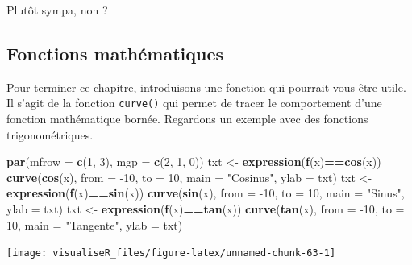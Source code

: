 \documentclass[]{article}
\newenvironment{Shaded}{\begin{snugshade}}{\end{snugshade}}
\newcommand{\DataTypeTok}[1]{\textcolor[rgb]{0.13,0.29,0.53}{#1}}
\newcommand{\DecValTok}[1]{\textcolor[rgb]{0.00,0.00,0.81}{#1}}
\newcommand{\KeywordTok}[1]{\textcolor[rgb]{0.13,0.29,0.53}{\textbf{#1}}}
\newcommand{\NormalTok}[1]{#1}
\newcommand{\OperatorTok}[1]{\textcolor[rgb]{0.81,0.36,0.00}{\textbf{#1}}}
\newcommand{\StringTok}[1]{\textcolor[rgb]{0.31,0.60,0.02}{#1}}
\begin{document}
Plutôt sympa, non ?

\hypertarget{fonctions-mathuxe9matiques}{%
\subsection{Fonctions mathématiques}\label{fonctions-mathuxe9matiques}}

Pour terminer ce chapitre, introduisons une fonction qui pourrait vous être utile. Il s'agit de la fonction \texttt{curve()} qui permet de tracer le comportement d'une fonction mathématique bornée. Regardons un exemple avec des fonctions trigonométriques.

\begin{Shaded}
\begin{Highlighting}[]
\KeywordTok{par}\NormalTok{(}\DataTypeTok{mfrow =} \KeywordTok{c}\NormalTok{(}\DecValTok{1}\NormalTok{, }\DecValTok{3}\NormalTok{), }\DataTypeTok{mgp =} \KeywordTok{c}\NormalTok{(}\DecValTok{2}\NormalTok{, }\DecValTok{1}\NormalTok{, }\DecValTok{0}\NormalTok{))}
\NormalTok{txt <-}\StringTok{ }\KeywordTok{expression}\NormalTok{(}\KeywordTok{f}\NormalTok{(x)}\OperatorTok{==}\KeywordTok{cos}\NormalTok{(x))}
\KeywordTok{curve}\NormalTok{(}\KeywordTok{cos}\NormalTok{(x), }\DataTypeTok{from =} \DecValTok{-10}\NormalTok{, }\DataTypeTok{to =} \DecValTok{10}\NormalTok{, }\DataTypeTok{main =} \StringTok{"Cosinus"}\NormalTok{, }\DataTypeTok{ylab =}\NormalTok{ txt)}
\NormalTok{txt <-}\StringTok{ }\KeywordTok{expression}\NormalTok{(}\KeywordTok{f}\NormalTok{(x)}\OperatorTok{==}\KeywordTok{sin}\NormalTok{(x))}
\KeywordTok{curve}\NormalTok{(}\KeywordTok{sin}\NormalTok{(x), }\DataTypeTok{from =} \DecValTok{-10}\NormalTok{, }\DataTypeTok{to =} \DecValTok{10}\NormalTok{, }\DataTypeTok{main =} \StringTok{"Sinus"}\NormalTok{, }\DataTypeTok{ylab =}\NormalTok{ txt)}
\NormalTok{txt <-}\StringTok{ }\KeywordTok{expression}\NormalTok{(}\KeywordTok{f}\NormalTok{(x)}\OperatorTok{==}\KeywordTok{tan}\NormalTok{(x))}
\KeywordTok{curve}\NormalTok{(}\KeywordTok{tan}\NormalTok{(x), }\DataTypeTok{from =} \DecValTok{-10}\NormalTok{, }\DataTypeTok{to =} \DecValTok{10}\NormalTok{, }\DataTypeTok{main =} \StringTok{"Tangente"}\NormalTok{, }\DataTypeTok{ylab =}\NormalTok{ txt)}
\end{Highlighting}
\end{Shaded}

\begin{center}\texttt{[image: visualiseR\_files/figure-latex/unnamed-chunk-63-1]} \end{center}
\end{document}
